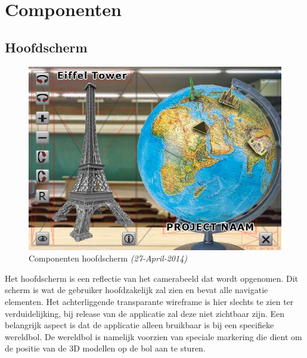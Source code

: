 \chapter{Componenten} \label{cha:componenten}


\section{Hoofdscherm} \label{sec:hoofdscherm}
\begin{figure}[h]
  \includegraphics[width=130mm]{figs/components1.jpg}
  \caption{Componenten hoofdscherm \textit{(27-April-2014)}}
  \label{fig:components1}
\end{figure}

Het hoofdscherm is een reflectie van het camerabeeld dat wordt opgenomen. Dit scherm is wat de gebruiker hoofdzakelijk zal zien en bevat alle navigatie elementen. Het achterliggende transparante wireframe is hier slechts te zien ter verduidelijking, bij release van de applicatie zal deze niet  zichtbaar zijn. Een belangrijk aspect is dat de applicatie alleen bruikbaar is bij een specifieke wereldbol. De wereldbol is namelijk voorzien van speciale markering die dient om de positie van de 3D modellen op de bol aan te sturen.

\newpage
